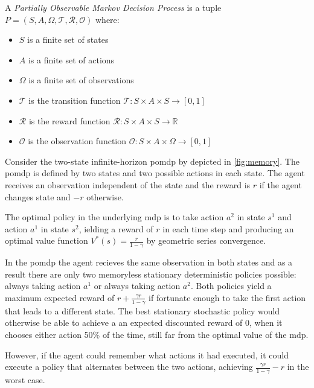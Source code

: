\begin{definition}
A \textit{Partially Observable Markov Decision Process} is a tuple $P = (S, A,\Omega, \mathcal{T}, \mathcal{R}, \mathcal{O})$ where:
\begin{itemize}
    \setlength\itemsep{0.01em}
    \item $S$ is a finite set of states
    \item $A$ is a finite set of actions
    \item $\Omega$ is a finite set of observations
    \item $\mathcal{T}$ is the transition function $\mathcal{T} : S \times A \times S \rightarrow [0,1]$
    \item $\mathcal{R}$ is the reward function $\mathcal{R} : S \times A \times S \rightarrow \mathbb{R}$
    \item $\mathcal{O}$ is the observation function $\mathcal{O} : S \times A \times \Omega \rightarrow [0,1]$
\end{itemize}
\end{definition}

\begin{example}    
    Consider the two-state infinite-horizon \gls{pomdp} by \cite{NIPS1994_1c1d4df5} depicted in \ref{fig:memory}. The \gls{pomdp} is 
    defined by two states and two possible actions in each state. The agent receives an observation 
    independent of the state and the reward is $r$ if the agent changes state and $-r$ otherwise.

    The optimal policy in the underlying \gls{mdp} is to take action $a^2$ in state $s^1$ and 
    action $a^1$ in state $s^2$, ielding a reward of $r$ in each time step and producing an 
    optimal value function $V^*(s)=\frac{r}{1-\gamma}$ by geometric series convergence. 
    
    In the \gls{pomdp} the agent recieves the same observation in both states and 
    as a result there are only two memoryless stationary deterministic policies possible: always taking action $a^1$ or always taking action $a^2$.
    Both policies yield a maximum expected reward of $r+\frac{\gamma r}{1-\gamma}$ if fortunate enough to take 
    the first action that leads to a different state. The best stationary stochastic policy would otherwise 
    be able to achieve a an expected discounted reward of 0, when it chooses either action 50\% of the time, still 
    far from the optimal value of the \gls{mdp}.

    However, if the agent could remember what actions it had executed, it could execute a policy that 
    alternates between the two actions, achieving  $\frac{\gamma r}{1-\gamma}-r$ in the worst case.
\end{example}

